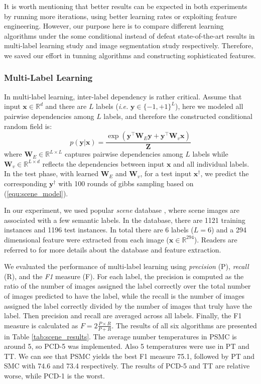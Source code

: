 It is worth mentioning that better results can be expected in both experiments by running more iterations, using better learning rates or exploiting 
feature engineering. However, our purpose here is to compare different learning algorithms under the some conditional instead of defeat state-of-the-art 
results in multi-label learning study and image segmentation study respectively. Therefore, we saved our effort in tunning algorithms and constructing 
sophisticated features. 

\subsubsection{Multi-Label Learning}
In multi-label learning, inter-label dependency is rather critical. Assume that input $\mathbf{x}\in \mathbb{R}^d$ and there are $L$ labels (\emph{i.e.} $\mathbf{y}\in\{-1,+1\}^L$), here we modeled all pairwise dependencies among $L$ labels, and therefore 
the constructed conditional random field is:
\begin{equation}
	p(\mathbf{y}|\mathbf{x})=\frac{\exp(\mathbf{y}^\top\mathbf{W}_E \mathbf{y}+\mathbf{y}^\top \mathbf{W}_v \mathbf{x})}{\mathbf{Z}}
	\label{equ:scene_model}
\end{equation}
where $\mathbf{W}_E\in \mathbb{R}^{L\times L}$ captures pairwise dependencies among $L$ labels while $\mathbf{W}_v\in \mathbb{R}^{L\times d}$ reflects the 
dependencies between input $\mathbf{x}$ and all individual labels.   
In the test phase, with learned $\mathbf{W}_E$ and $\mathbf{W}_v$, for a test input $\mathbf{x}^\dagger$, we predict the corresponding $\mathbf{y}^\dagger$ with 
100 rounds of gibbs sampling based on (\ref{equ:scene_model}).  

In our experiment, we used popular \emph{scene} database \citep{scene_database}, where scene images are associated with a few semantic labels. In the database, 
there are 1121 training instances and 1196 test instances.  In total there are 6 labels ($L=6$) and a 294 dimensional feature were extracted from each image         
($\mathbf{x}\in\mathbb{R}^{294}$). Readers are referred to \cite{scene_database} for more details about the database and feature extraction.  

We evaluated the performance of multi-label learning using \emph{precision} (P), \emph{recall} (R), and the \emph{F1} measure (F). For each label, the precision is 
computed as the ratio of the number of images assigned the label correctly over the total number of images predicted to have the label, while the recall is the number of images 
assigned the label correctly divided by the number of images that truly have the label. Then precision and recall are averaged across all labels. Finally, the F1 measure is calculated as 
$F=2\frac{P\times R}{P+R}$.
The results of all six algorithms are presented in Table \ref{tab:scene_results}.     
The average number temperatures in PSMC is around 5, so PCD-5 was implemented. Also 5 temperatures were use in PT and TT.    
We can see that PSMC yields the best F1 measure 75.1, followed by PT and SMC with 74.6 and 73.4 respectively. The results of PCD-5 and TT             
are relative worse, while PCD-1 is the worst.  


